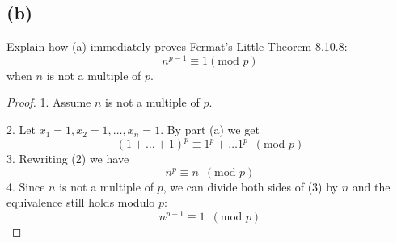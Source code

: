 \documentclass[14pt]{extarticle}
\begin{document}
\subsection{(b)}
Explain how (a) immediately proves Fermat’s Little Theorem 8.10.8: 
$$
n^{p-1} \equiv 1 (\text{mod }p)
$$
when $n$ is not a multiple of $p$.
\begin{proof}
1. Assume $n$ is not a multiple of $p$.

2. Let $x_1 = 1, x_2 = 1, \ldots, x_n = 1$. By part (a) we get
$$
(1 + \ldots + 1)^p \equiv 1^p + \ldots 1^p \,\,\,(\text{mod}\,\,p)
$$
3. Rewriting (2) we have
$$
n^p \equiv n \,\,\,(\text{mod}\,\,p)
$$
4. Since $n$ is not a multiple of $p$, we can divide both sides of (3) by $n$ and the equivalence still holds modulo $p$:
$$
n^{p-1} \equiv 1 \,\,\,(\text{mod}\,\,p)
$$
\end{proof}
\end{document}
